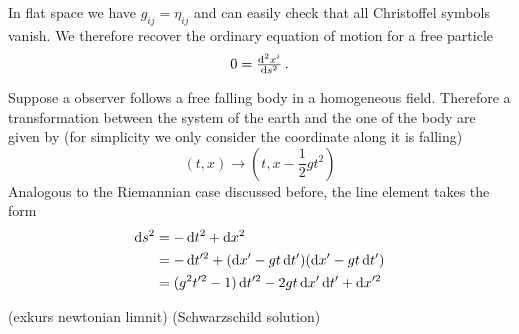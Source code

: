 In flat space we have $g_{ij}=\eta_{ij}$ and can easily check that all
Christoffel symbols vanish. We therefore recover the ordinary equation of motion for a free particle
\begin{equation}
    0 = \od[2]{x^i}{s}\, .
\end{equation}
\begin{example}
Suppose a observer follows a free falling body in a homogeneous field. 
Therefore a transformation between the system of the earth and the one of the body are given by 
(for simplicity we only consider the coordinate along it is falling)
\begin{equation}
    (t,x)\to\left(t,x-\frac{1}{2}gt^2\right)
\end{equation}
Analogous to the Riemannian case discussed before, the line element takes the form
\begin{equation}
    \begin{split}
	    \dif s^2&=-\dif t^2 +\dif x^2\\
	    &=-\dif t'^2+(\dif x'- gt\dif t')(\dif x'- gt\dif t')\\
	    &=(g^2t'^2-1)\dif t'^2-2gt\dif x'\dif t'+\dif x'^2
    \end{split}
\end{equation}
\end{example}
(exkurs newtonian limnit)
(Schwarzschild solution)